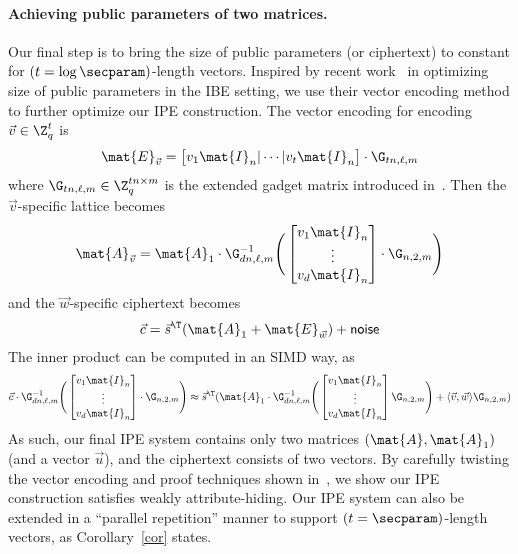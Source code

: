 \paragraph{Achieving public parameters of two matrices.} Our final step is to bring the size of public parameters (or ciphertext) to constant for $(t = \log \secparam)$-length vectors. Inspired by recent work~\cite{EPRINT:ApoFanLiu16a} in optimizing size of public parameters in the IBE setting, we use their vector encoding method to further optimize our IPE construction. The vector encoding for encoding $\vec{v} \in \Z_q^t$ is
$$\mat{E}_{\vec{v}} = \big[v_1 \mat{I}_n | \cdots | v_t \mat{I}_n \big] \cdot
\G_{tn, \ell, m}$$
where $\G_{tn, \ell, m} \in \Z_q^{tn \times m}$ is the extended gadget matrix introduced in~\cite{EC:MicPei12,EPRINT:ApoFanLiu16a}. Then the $\vec{v}$-specific lattice becomes
$$\mat{A}_{\vec{v}} = \mat{A}_1 \cdot \G_{dn, \ell, m}^{-1}
 \Bigg(\begin{bmatrix}
v_{1}\mat{I}_n \\
\vdots \\
v_{d}\mat{I}_n
\end{bmatrix} \cdot \G_{n, 2, m}\Bigg) $$
and the $\vec{w}$-specific ciphertext becomes
$$\vec{c} = \vec{s}^\T ( \mat{A}_1 +  \mat{E}_{\vec{w}}) + \mathsf{noise}$$
The inner product can be computed in an SIMD way, as
$$ \vec{c} \cdot \G_{dn, \ell, m}^{-1}
 \Bigg(\begin{bmatrix}
v_{1}\mat{I}_n \\
\vdots \\
v_{d}\mat{I}_n
\end{bmatrix} \cdot \G_{n, 2, m}\Bigg) \approx \vec{s}^\T (\mat{A}_1\cdot \G_{dn, \ell, m}^{-1}
 \Bigg(\begin{bmatrix}
v_{1}\mat{I}_n \\
\vdots \\
v_{d}\mat{I}_n
\end{bmatrix} \G_{n, 2, m}\Bigg) +  \langle \vec{v}, \vec{w} \rangle \G_{n, 2, m})$$
As such, our final IPE system contains only two matrices $(\mat{A}, \mat{A}_1)$ (and a vector $\vec{u}$), and the ciphertext consists of two vectors. By carefully twisting the vector encoding and proof techniques shown in~\cite{AC:AgrFreVai11}, we show our IPE construction satisfies weakly attribute-hiding. Our IPE system can also be extended in a ``parallel repetition'' manner to support $(t = \secparam)$-length vectors, as Corollary~\ref{cor} states.


